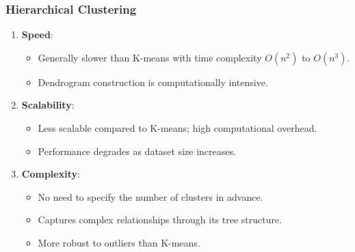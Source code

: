 \documentclass{beamer}
\begin{document}
\begin{frame}[fragile]
    \frametitle{Hierarchical Clustering}
    \begin{enumerate}
        \item \textbf{Speed}:
        \begin{itemize}
            \item Generally slower than K-means with time complexity \( O(n^2) \) to \( O(n^3) \).
            \item Dendrogram construction is computationally intensive.
        \end{itemize}

        \item \textbf{Scalability}:
        \begin{itemize}
            \item Less scalable compared to K-means; high computational overhead.
            \item Performance degrades as dataset size increases.
        \end{itemize}

        \item \textbf{Complexity}:
        \begin{itemize}
            \item No need to specify the number of clusters in advance.
            \item Captures complex relationships through its tree structure.
            \item More robust to outliers than K-means.
        \end{itemize}
    \end{enumerate}
\end{frame}
\end{document}
